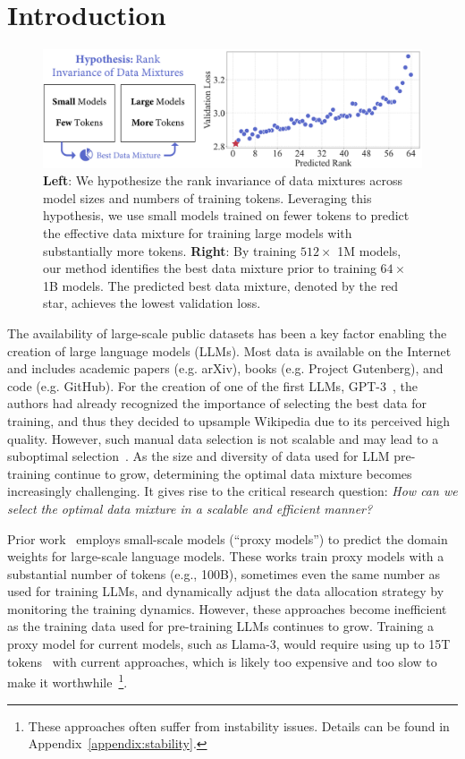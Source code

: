 \section{Introduction}

\begin{figure}[t]
    \centering
    \includegraphics[width=1.0\textwidth]{figures/figure_1_overview.pdf}
    \caption{\textbf{Left}: We hypothesize the rank invariance of data mixtures across model sizes and numbers of training tokens. Leveraging this hypothesis, we use small models trained on fewer tokens to predict the effective data mixture for training large models with substantially more tokens. \textbf{Right}: By training $512 \times$ 1M models, our method identifies the best data mixture prior to training $64 \times$ 1B models. The predicted best data mixture, denoted by the red star, achieves the lowest validation loss.}
    \label{fig:1M_to_1B}
\end{figure}

The availability of large-scale public datasets has been a key factor enabling the creation of large language models (LLMs). Most data is available on the Internet and includes academic papers (e.g. arXiv), books (e.g. Project Gutenberg), and code (e.g. GitHub). For the creation of one of the first LLMs, GPT-3~\citep{gpt3paper}, the authors had already recognized the importance of selecting the best data for training, and thus they decided to upsample Wikipedia due to its perceived high quality. However, such manual data selection is not scalable and may lead to a suboptimal selection~\citep{albalak2024survey}.
As the size and diversity of data used for LLM pre-training continue to grow, determining the optimal data mixture becomes increasingly challenging.
It gives rise to the critical research question: \textit{How can we select the optimal data mixture in a scalable and efficient manner?} 

Prior work~\citep{xie2023doremi,fan2023doge,albalak2023efficient} employs small-scale models (``proxy models'') to predict the domain weights for large-scale language models. These works train proxy models with a substantial number of tokens (e.g., 100B), sometimes even the same number as used for training LLMs, and dynamically adjust the data allocation strategy by monitoring the training dynamics. However, these approaches become inefficient as the training data used for pre-training LLMs continues to grow.
Training a proxy model for current models, such as Llama-3, would require using up to 15T tokens~\citep{meta_llama_3_2024} with current approaches, which is likely too expensive and too slow to make it worthwhile~\footnote{These approaches often suffer from instability issues. Details can be found in Appendix~\ref{appendix:stability}.}.

